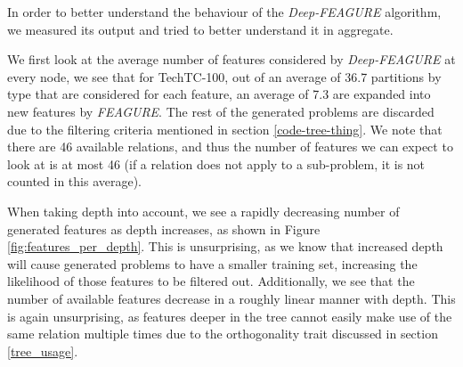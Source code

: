 \documentclass[twoside,11pt]{article}
\theoremstyle{definition}
\begin{document}
In order to better understand the behaviour of the \emph{Deep-FEAGURE} algorithm, we measured its output and tried to better understand it in aggregate.


We first look at the average number of features considered by \emph{Deep-FEAGURE} at every node, we see that for TechTC-100, out of an average of 36.7 partitions by type that are considered for each feature, an average of 7.3 are expanded into new features by \emph{FEAGURE}. The rest of the generated problems are discarded due to the filtering criteria mentioned in section \ref{code-tree-thing}.
We note that there are 46 available relations, and thus the number of features we can expect to look at is at most 46 (if a relation does not apply to a sub-problem, it is not counted in this average). 

When taking depth into account, we see a rapidly decreasing number of generated features as depth increases, as shown in Figure \ref{fig:features_per_depth}.
This is unsurprising, as we know that increased depth will cause generated problems to have a smaller training set, increasing the likelihood of those features to be filtered out. Additionally, we see that the number of available features decrease in a roughly linear manner with depth. This is again unsurprising, as features deeper in the tree cannot easily make use of the same relation multiple times due to the orthogonality trait discussed in section \ref{tree_usage}.
\end{document}

